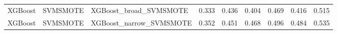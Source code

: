 \begin{tabular}{lllllllll}
                     XGBoost &            SVMSMOTE &                       XGBoost\_broad\_SVMSMOTE & 0.333 &                     0.436 &                 0.404 &                  0.469 &                                   0.416 &     0.515 \\
                     XGBoost &            SVMSMOTE &                      XGBoost\_narrow\_SVMSMOTE & 0.352 &                     0.451 &                 0.468 &                  0.496 &                                   0.484 &     0.535 \\
\bottomrule
\end{tabular}
